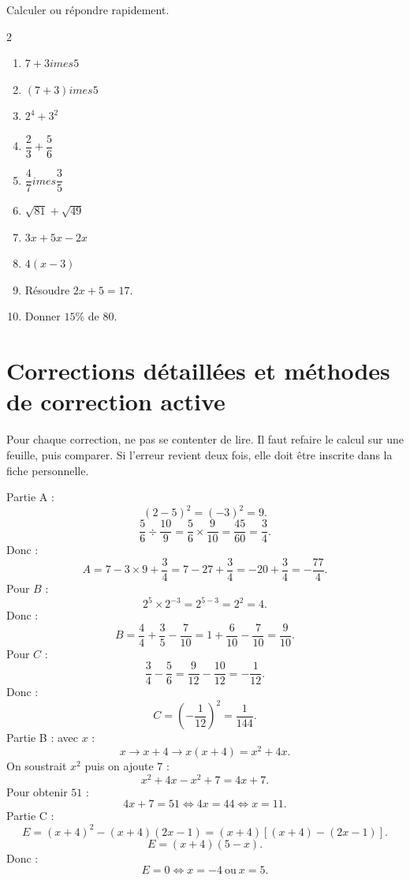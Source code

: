 \documentclass[11pt,a4paper]{article}
\newcounter{exercice}
\newcounter{correction}
\begin{document}
\begin{exercice}
Calculer ou répondre rapidement.
\begin{multicols}{2}
\begin{enumerate}[label=\alph*)]
  \item $7+3	imes 5$
  \item $(7+3)	imes 5$
  \item $2^4+3^2$
  \item $\dfrac{2}{3}+\dfrac{5}{6}$
  \item $\dfrac{4}{7}	imes\dfrac{3}{5}$
  \item $\sqrt{81}+\sqrt{49}$
  \item $3x+5x-2x$
  \item $4(x-3)$
  \item Résoudre $2x+5=17$.
  \item Donner $15\%$ de $80$.
\end{enumerate}
\end{multicols}
\end{exercice}
\newpage
\section{Corrections détaillées et méthodes de correction active}

\begin{methode}
Pour chaque correction, ne pas se contenter de lire. Il faut refaire le calcul sur une feuille, puis comparer. Si l'erreur revient deux fois, elle doit être inscrite dans la fiche personnelle.
\end{methode}
\begin{correction}[M-LONG-01]
Partie A :
\[
(2-5)^2=(-3)^2=9.
\]
\[
\frac{5}{6}\div\frac{10}{9}=\frac{5}{6}\times\frac{9}{10}=\frac{45}{60}=\frac34.
\]
Donc :
\[
A=7-3\times9+\frac34=7-27+\frac34=-20+\frac34=-\frac{77}{4}.
\]
Pour $B$ :
\[
2^5\times2^{-3}=2^{5-3}=2^2=4.
\]
Donc :
\[
B=\frac44+\frac35-\frac7{10}=1+\frac6{10}-\frac7{10}=\frac9{10}.
\]
Pour $C$ :
\[
\frac34-\frac56=\frac9{12}-\frac{10}{12}=-\frac1{12}.
\]
Donc :
\[
C=\left(-\frac1{12}\right)^2=\frac1{144}.
\]
Partie B : avec $x$ :
\[
x\rightarrow x+4\rightarrow x(x+4)=x^2+4x.
\]
On soustrait $x^2$ puis on ajoute $7$ :
\[
x^2+4x-x^2+7=4x+7.
\]
Pour obtenir $51$ :
\[
4x+7=51\Longleftrightarrow 4x=44\Longleftrightarrow x=11.
\]
Partie C :
\[
E=(x+4)^2-(x+4)(2x-1)=(x+4)[(x+4)-(2x-1)].
\]
\[
E=(x+4)(5-x).
\]
Donc :
\[
E=0\Longleftrightarrow x=-4\ \text{ou}\ x=5.
\]
\end{correction}
\end{document}
